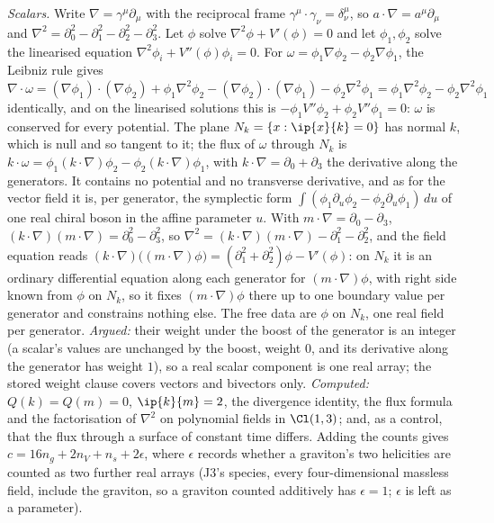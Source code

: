 \emph{Scalars.} Write $\nabla = \gamma^{\mu}\partial_{\mu}$ with the reciprocal frame $\gamma^{\mu}\cdot\gamma_{\nu} = \delta^{\mu}_{\nu}$, so $a\cdot\nabla = a^{\mu}\partial_{\mu}$ and $\nabla^{2} = \partial_{0}^{2} - \partial_{1}^{2} - \partial_{2}^{2} - \partial_{3}^{2}$. Let $\phi$ solve $\nabla^{2}\phi + V'(\phi) = 0$ and let $\phi_{1}, \phi_{2}$ solve the linearised equation $\nabla^{2}\phi_{i} + V''(\phi)\phi_{i} = 0$. For $\omega = \phi_{1}\nabla\phi_{2} - \phi_{2}\nabla\phi_{1}$, the Leibniz rule gives $\nabla\cdot\omega = (\nabla\phi_{1})\cdot(\nabla\phi_{2}) + \phi_{1}\nabla^{2}\phi_{2} - (\nabla\phi_{2})\cdot(\nabla\phi_{1}) - \phi_{2}\nabla^{2}\phi_{1} = \phi_{1}\nabla^{2}\phi_{2} - \phi_{2}\nabla^{2}\phi_{1}$ identically, and on the linearised solutions this is $-\phi_{1}V''\phi_{2} + \phi_{2}V''\phi_{1} = 0$: $\omega$ is conserved for every potential. The plane $N_{k} = \{x : \ip{x}{k} = 0\}$ has normal $k$, which is null and so tangent to it; the flux of $\omega$ through $N_{k}$ is $k\cdot\omega = \phi_{1}(k\cdot\nabla)\phi_{2} - \phi_{2}(k\cdot\nabla)\phi_{1}$, with $k\cdot\nabla = \partial_{0} + \partial_{3}$ the derivative along the generators. It contains no potential and no transverse derivative, and as for the vector field it is, per generator, the symplectic form $\int(\phi_{1}\partial_{u}\phi_{2} - \phi_{2}\partial_{u}\phi_{1})\,du$ of one real chiral boson in the affine parameter $u$. With $m\cdot\nabla = \partial_{0} - \partial_{3}$, $(k\cdot\nabla)(m\cdot\nabla) = \partial_{0}^{2} - \partial_{3}^{2}$, so $\nabla^{2} = (k\cdot\nabla)(m\cdot\nabla) - \partial_{1}^{2} - \partial_{2}^{2}$, and the field equation reads $(k\cdot\nabla)\bigl((m\cdot\nabla)\phi\bigr) = (\partial_{1}^{2} + \partial_{2}^{2})\phi - V'(\phi)$: on $N_{k}$ it is an ordinary differential equation along each generator for $(m\cdot\nabla)\phi$, with right side known from $\phi$ on $N_{k}$, so it fixes $(m\cdot\nabla)\phi$ there up to one boundary value per generator and constrains nothing else. The free data are $\phi$ on $N_{k}$, one real field per generator. \emph{Argued:} their weight under the boost of the generator is an integer (a scalar's values are unchanged by the boost, weight $0$, and its derivative along the generator has weight $1$), so a real scalar component is one real array; the stored weight clause covers vectors and bivectors only. \emph{Computed:} $Q(k) = Q(m) = 0$, $\ip{k}{m} = 2$, the divergence identity, the flux formula and the factorisation of $\nabla^{2}$ on polynomial fields in $\Cl(1,3)$; and, as a control, that the flux through a surface of constant time differs. Adding the counts gives $c = 16n_{g} + 2n_{V} + n_{s} + 2\epsilon$, where $\epsilon$ records whether a graviton's two helicities are counted as two further real arrays (J3's species, every four-dimensional massless field, include the graviton, so a graviton counted additively has $\epsilon = 1$; $\epsilon$ is left as a parameter).

